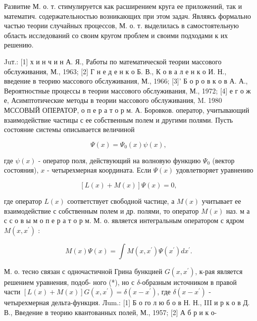 \documentclass[10pt]{article}
\begin{document}
Развитие М. о. т. стимулируется как расширением круга ее приложений, так и математич. содержательностью возникающих при этом задач. Являясь формально частью теории случайных процессов, М. о. т. выделилась в самостоятельную область исследований со своим кругом проблем и своими подходами к их решению.



Juт.: [1] х и н ч и н А. Я., Работы по математической теории массового обслуживания, М., 1963; [2] Г н е д е н к о Б. В., К о в а л е н к о И. Н., введение в теорию массового обслуживания, М., 1966; [3]' Б о р о в к о в А. А., Вероятностные процессы в теории массового обслуживания, М., 1972; [4] е г о ж е, Асимптотические методы в теории массового обслуживания, M. 1980 МССОВЫЙ ОПЕРАТОР, о п е р а т о р м. А. Боровков. оператор, учитывающий взаимодействие частицы с ее собственным полем и другими полями. Пусть состояние системы описывается величиной



\[

\Psi(x)=\Psi_{0}(x) \psi(x),

\]



где $\psi(x)$ - оператор поля, действующий на волновую функцию $\Psi_{0}$ (вектор состояния), $x$ - четырехмерная координата. Если $\Psi(x)$ удовлетворяет уравнению



\[

[L(x)+M(x)] \Psi(x)=0,

\]



где оператор $L(x)$ соответствует свободной частице, а $M(x)$ учитывает ее взаимодействие с собственным полем и др. полями, то оператор $M(x)$ наз. м а с с о в ы м о п е р а т о р м. М. о. является интегральным оператором с ядром $M\left(x, x^{\prime}\right)$ :



\[

M(x) \Psi(x)=\int M\left(x, x^{\prime}\right) \Psi\left(x^{\prime}\right) d x^{\prime} .

\]



М. о. тесно связан с одночастичной Грина бункцией $G\left(x, x^{\prime}\right)$, к-рая является решением уравнения, подоб- ного (*), но с $\delta$-образным источником в правой части $[L(x)+M(x)] G\left(x, x^{\prime}\right)=\delta\left(x-x^{\prime}\right)$, где $\delta\left(x-x^{\prime}\right)$ - четырехмерная дельта-функция. Лum.: [1] Б о го л ю б о в Н. Н., III и р к о в Д. В., Введение в теорию квантованных полей, М., 1957; [2] А б р и к о-
\end{document}
